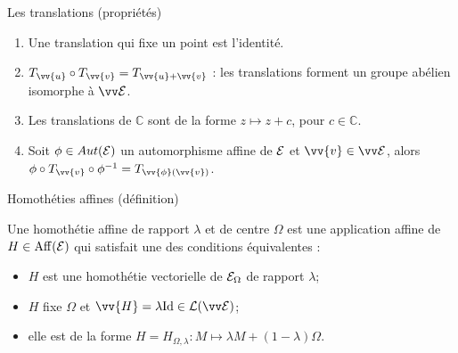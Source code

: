 \documentclass[bigger]{m53beamer}
\begin{document}
  \begin{frame}{Les translations (propriétés)}
    \begin{enumerate}[<+(1)->]
      \item Une translation qui fixe un point est l'identité.
      \item $T_{\vv{u}}\circ T_{\vv{v}} = T_{\vv{u}+\vv{v}}$ : les translations forment un groupe abélien isomorphe à $\ev{E}$.
      \item Les translations de $\mathbb{C}$ sont de la forme $z \mapsto z+c$, pour $c \in \mathbb{C}$.
      \item Soit $\phi \in Aut(\mathcal{E})$ un automorphisme affine de $\mathcal{E}$ et $\vv{v} \in \ev{E}$, alors $\phi\circ T_{\vv{v}}\circ\phi^{-1}=T_{\vv{\phi}(\vv{v})}$.
    \end{enumerate}
  \end{frame}
  \begin{frame}{Homothéties affines (définition)}
    \begin{defprop}
      Une \alert{homothétie affine de rapport $\lambda$ et de centre $\Omega$} est une application affine de $H \in\operatorname{Aff}(\mathcal{E})$ qui satisfait une des conditions équivalentes :
      \begin{itemize}[<+(1)->]
        \item $H$ est une homothétie vectorielle de $\mathcal{E}_{\Omega}$ de rapport $\lambda$;
        \item $H$ fixe $\Omega$ et $\vv{H}=\lambda\id \in \mathcal{L}(\ev{E})$;
        \item elle est de la forme $H=H_{\Omega,\lambda}:M \mapsto \lambda M + (1- \lambda)\Omega$.
      \end{itemize}
    \end{defprop}
  \end{frame}
\end{document}
